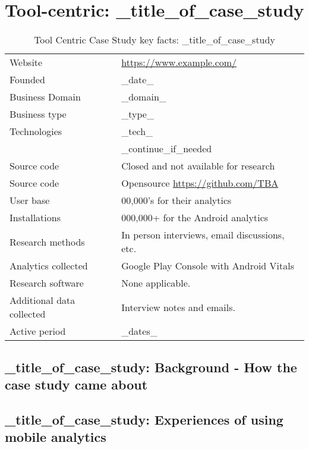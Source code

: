 \section{Tool-centric: _title_of_case_study} %
{\renewcommand{\arraystretch}{0.8}%
\begin{table}[htbp!]
    \centering
    \small
    \setlength{\tabcolsep}{1pt}
    \begin{tabular}{lp{9cm}}
       \toprule
       Website &\url{https://www.example.com/} \\
       Founded & _date_ \\
       Business Domain & _domain_ \\
       Business type & _type_ \\
       Technologies  & _tech_ \\
       & _continue_if_needed \\
       Source code  &Closed and not available for research \\
       Source code  & Opensource \url{https://github.com/TBA} \\
       \midrule
       User base & 00,000's for their analytics \\
       Installations & 000,000+ for the Android analytics \\
       \midrule
       Research methods &In person interviews, email discussions, etc. \\
       Analytics collected &Google Play Console with Android Vitals \\
       Research software & None applicable. \\
       Additional data collected &Interview notes and emails. \\
       Active period & _dates_ \\
       \bottomrule
    \end{tabular}
    \caption{Tool Centric Case Study key facts: _title_of_case_study}
    \label{tab:blank_case_study_anaytics_overview}
\end{table}
}

\subsection{_title_of_case_study: Background - How the case study came about}

\subsection{_title_of_case_study: Experiences of using mobile analytics}

